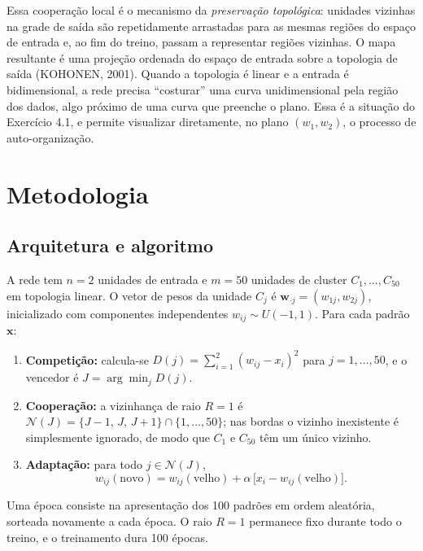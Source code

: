 \documentclass[12pt,a4paper,oneside]{article}
\begin{document}
Essa cooperação local é o mecanismo da \emph{preservação topológica}:
unidades vizinhas na grade de saída são repetidamente arrastadas para as
mesmas regiões do espaço de entrada e, ao fim do treino, passam a representar
regiões vizinhas. O mapa resultante é uma projeção ordenada do espaço de
entrada sobre a topologia de saída (KOHONEN, 2001). Quando a topologia é
linear e a entrada é bidimensional, a rede precisa ``costurar'' uma curva
unidimensional pela região dos dados, algo próximo de uma curva que preenche
o plano. Essa é a situação do Exercício 4.1, e permite visualizar
diretamente, no plano $(w_1,w_2)$, o processo de auto-organização.

\section{Metodologia}

\subsection{Arquitetura e algoritmo}

A rede tem $n=2$ unidades de entrada e $m=50$ unidades de cluster
$C_1,\dots,C_{50}$ em topologia linear. O vetor de pesos da unidade $C_j$ é
$\mathbf{w}_{\cdot j}=(w_{1j},w_{2j})$, inicializado com componentes
independentes $w_{ij}\sim U(-1,1)$. Para cada padrão $\mathbf{x}$:

\begin{enumerate}
  \item \textbf{Competição:} calcula-se
  $D(j)=\sum_{i=1}^{2}(w_{ij}-x_i)^2$ para $j=1,\dots,50$, e o vencedor é
  $J=\arg\min_j D(j)$.
  \item \textbf{Cooperação:} a vizinhança de raio $R=1$ é
  $\mathcal{N}(J)=\{J-1,\,J,\,J+1\}\cap\{1,\dots,50\}$; nas bordas o vizinho
  inexistente é simplesmente ignorado, de modo que $C_1$ e $C_{50}$ têm um
  único vizinho.
  \item \textbf{Adaptação:} para todo $j\in\mathcal{N}(J)$,
  \begin{equation}
    w_{ij}(\text{novo}) = w_{ij}(\text{velho})
      + \alpha\,\bigl[x_i - w_{ij}(\text{velho})\bigr].
    \label{eq:atualizacao}
  \end{equation}
\end{enumerate}

Uma época consiste na apresentação dos 100 padrões em ordem aleatória,
sorteada novamente a cada época. O raio $R=1$ permanece fixo durante todo o
treino, e o treinamento dura 100 épocas.
\end{document}
